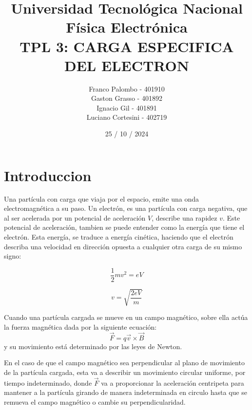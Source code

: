 \documentclass[a4paper,12pt]{report}
\title{
  \fontsize{25}{0}\selectfont Universidad Tecnológica Nacional\\
  \fontsize{22}{30}\selectfont Física Electrónica\\
  \fontsize{18}{25}\selectfont TPL 3: CARGA ESPECIFICA DEL ELECTRON\\
}
\author{
Franco Palombo - 401910\\
Gaston Grasso - 401892\\
Ignacio Gil - 401891\\
Luciano Cortesini - 402719\\
}
\date{25 / 10 / 2024}
\begin{document}
\maketitle

\chapter{Introduccion}

    Una partícula con carga que viaja por el espacio, emite una onda electromagnética a su paso. Un electrón, es una
    partícula con carga negativa, que al ser acelerada por un potencial de aceleración $V$, describe una rapidez $v$.
    Este potencial de aceleración, tambien se puede entender como la energía que tiene el electrón. Esta energía, se
    traduce a energía cinética, haciendo que el electrón describa una velocidad en dirección opuesta a cualquier otra
    carga de su mismo signo:
    \begin{figure}[h!]
        \centering
        \begin{minipage}{0.3\textwidth}
            \begin{equation*}
                \frac{1}{2} m v^2 = eV
            \end{equation*}
        \end{minipage}
        \begin{minipage}{0.3\textwidth}
            \begin{equation}
                \label{v.electron}
                v = \sqrt{\frac{2 eV}{m}}
            \end{equation}
        \end{minipage}
    \end{figure}

    Cuando una partícula cargada se mueve en un campo magnético, sobre ella actúa la fuerza magnética dada por la
    siguiente ecuación:
    \begin{equation}
        \vec{F} = q \vec{v} \times \vec{B}
    \end{equation}
    y su movimiento está determinado por las leyes de Newton.

    En el caso de que el campo magnético sea perpendicular al plano de movimiento de la partícula cargada, esta
    va a describir un movimiento circular uniforme, por tiempo indeterminado, donde $\vec{F}$ va a proporcionar la
    aceleración centripeta para mantener a la partícula girando de manera indeterminada en circulo hasta que se
    remueva el campo magnético o cambie su perpendicularidad.
\end{document}
